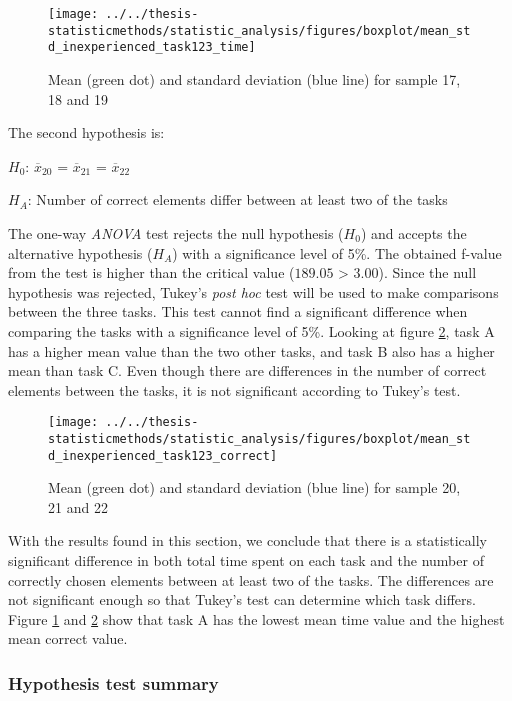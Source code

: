 \begin{figure}[H]
	\centering
	\texttt{[image: ../../thesis-statisticmethods/statistic\_analysis/figures/boxplot/mean\_std\_inexperienced\_task123\_time]}
	\caption{Mean (green dot) and standard deviation (blue line) for sample 17, 18 and 19}
	\label{fig:meanstdinexperiencedtask123time}
\end{figure}

The second hypothesis is:\\
\centerline{$H_{0}$: $\overline{x}_{20}$ = $\overline{x}_{21}$ = $\overline{x}_{22}$}
\centerline{$H_{A}$: Number of correct elements differ between at least two of the tasks}
\vspace{0.2cm}

The one-way \textit{ANOVA} test rejects the null hypothesis ($H_0$) and accepts the alternative hypothesis ($H_{A}$) with a significance level of 5\%. The obtained f-value from the test is higher than the critical value ($189.05$ > $3.00$). Since the null hypothesis was rejected, Tukey's \textit{post hoc} test will be used to make comparisons between the three tasks. This test cannot find a significant difference when comparing the tasks with a significance level of 5\%. Looking at figure \ref{fig:meanstdinexperiencedtask123correct}, task A has a higher mean value than the two other tasks, and task B also has a higher mean than task C. Even though there are differences in the number of correct elements between the tasks, it is not significant according to Tukey's test. 

\begin{figure}[H]
	\centering
	\texttt{[image: ../../thesis-statisticmethods/statistic\_analysis/figures/boxplot/mean\_std\_inexperienced\_task123\_correct]}
	\caption{Mean (green dot) and standard deviation (blue line) for sample 20, 21 and 22}
	\label{fig:meanstdinexperiencedtask123correct}
\end{figure}

With the results found in this section, we conclude that there is a statistically significant difference in both total time spent on each task and the number of correctly chosen elements between at least two of the tasks. The differences are not significant enough so that Tukey's test can determine which task differs. Figure \ref{fig:meanstdinexperiencedtask123time} and \ref{fig:meanstdinexperiencedtask123correct} show that task A has the lowest mean time value and the highest mean correct value. 

\subsubsection{Hypothesis test summary}

